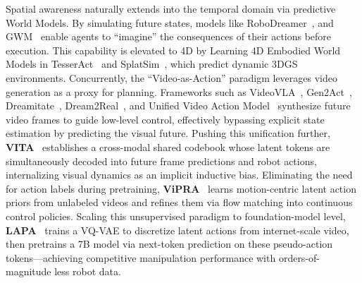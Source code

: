 \documentclass[acmsmall,screen,review,anonymous]{acmart}
\begin{document}
Spatial awareness naturally extends into the temporal domain via predictive World Models. By simulating future states, models like RoboDreamer~\cite{zhou2024robodreamer}, and GWM~\cite{lu2025gwm} enable agents to ``imagine'' the consequences of their actions before execution. This capability is elevated to 4D by Learning 4D Embodied World Models in TesserAct~\cite{zhen2025tesseract} and SplatSim~\cite{qureshi2024splatsim}, which predict dynamic 3DGS environments. Concurrently, the ``Video-as-Action'' paradigm leverages video generation as a proxy for planning. Frameworks such as VideoVLA~\cite{shen2025videovla}, Gen2Act~\cite{bharadhwaj2024gen2act}, Dreamitate~\cite{liang2024dreamitate}, Dream2Real~\cite{kapelyukh2024dream2real}, and Unified Video Action Model~\cite{li2025uva} synthesize future video frames to guide low-level control, effectively bypassing explicit state estimation by predicting the visual future. Pushing this unification further, \textbf{VITA}~\cite{gao2025vita} establishes a cross-modal shared codebook whose latent tokens are simultaneously decoded into future frame predictions and robot actions, internalizing visual dynamics as an implicit inductive bias. Eliminating the need for action labels during pretraining, \textbf{ViPRA}~\cite{routray2025vipra} learns motion-centric latent action priors from unlabeled videos and refines them via flow matching into continuous control policies. Scaling this unsupervised paradigm to foundation-model level, \textbf{LAPA}~\cite{ye2025lapa} trains a VQ-VAE to discretize latent actions from internet-scale video, then pretrains a 7B model via next-token prediction on these pseudo-action tokens---achieving competitive manipulation performance with orders-of-magnitude less robot data.
\end{document}
